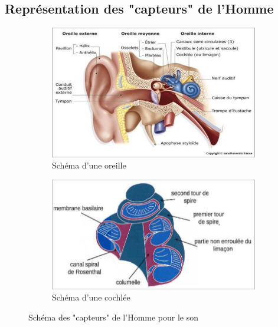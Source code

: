 \subsection{Représentation des "capteurs" de l'Homme}
\begin{figure}[hbt!]
    \begin{subfigure}{.47\textwidth}
      \centering
      \includegraphics[width=.7\linewidth]{Pics/Oreille.png}
      \caption{Schéma d'une oreille}
      \label{fig:sfig1}
    \end{subfigure}%
    \begin{subfigure}{.55\textwidth}
      \centering
      \includegraphics[width=.7\linewidth]{Pics/Cochlee.png}
      \caption{Schéma d'une cochlée}
      \label{fig:sfig2}
    \end{subfigure}
    \caption{Schéma des "capteurs" de l'Homme pour le son}
    \label{fig:fig}
\end{figure}
